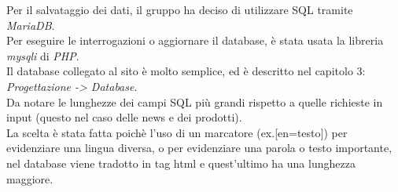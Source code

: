 ﻿Per il salvataggio dei dati, il gruppo ha deciso di utilizzare SQL tramite \emph{MariaDB}.\\
Per eseguire le interrogazioni o aggiornare il database, è stata usata la libreria \emph{mysqli} di \emph{PHP}.\\
Il database collegato al sito è molto semplice, ed è descritto nel capitolo 3: \emph{Progettazione -> Database}.
\\
Da notare le lunghezze dei campi SQL più grandi rispetto a quelle richieste in input (questo nel caso delle news e dei prodotti).\\
La scelta è stata fatta poichè l'uso di un marcatore (ex.[en=testo]) per evidenziare una lingua diversa, o per evidenziare una parola o testo importante,
nel database viene tradotto in tag html e quest'ultimo ha una lunghezza maggiore.
